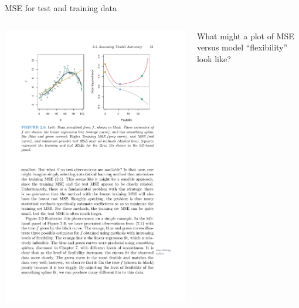 \documentclass[aspectratio=169]{beamer}
\begin{document}
\begin{frame}{MSE for test and training data}


\begin{columns}


\includegraphics[scale=1]{figures/islr2_9a.pdf}


What might a plot of MSE versus model ``flexibility'' look like?




\end{columns}
\end{frame}
\end{document}
